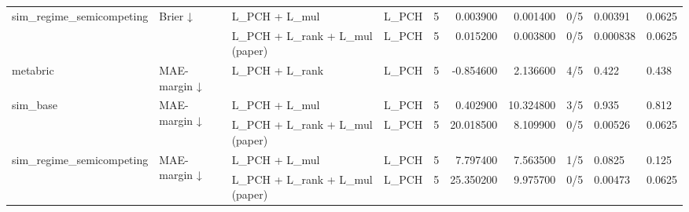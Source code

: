 \begin{tabular}{llllrrrlll}
\cline{1-10} \cline{2-10}
\multirow[t]{2}{*}{sim\_regime\_semicompeting} & \multirow[t]{2}{*}{Brier ↓} & L\_PCH + L\_mul & L\_PCH & 5 & 0.003900 & 0.001400 & 0/5 & 0.00391 & 0.0625 \\
 &  & L\_PCH + L\_rank + L\_mul (paper) & L\_PCH & 5 & 0.015200 & 0.003800 & 0/5 & 0.000838 & 0.0625 \\
\cline{1-10} \cline{2-10}
metabric & MAE-margin ↓ & L\_PCH + L\_rank & L\_PCH & 5 & -0.854600 & 2.136600 & 4/5 & 0.422 & 0.438 \\
\cline{1-10} \cline{2-10}
\multirow[t]{2}{*}{sim\_base} & \multirow[t]{2}{*}{MAE-margin ↓} & L\_PCH + L\_mul & L\_PCH & 5 & 0.402900 & 10.324800 & 3/5 & 0.935 & 0.812 \\
 &  & L\_PCH + L\_rank + L\_mul (paper) & L\_PCH & 5 & 20.018500 & 8.109900 & 0/5 & 0.00526 & 0.0625 \\
\cline{1-10} \cline{2-10}
\multirow[t]{2}{*}{sim\_regime\_semicompeting} & \multirow[t]{2}{*}{MAE-margin ↓} & L\_PCH + L\_mul & L\_PCH & 5 & 7.797400 & 7.563500 & 1/5 & 0.0825 & 0.125 \\
 &  & L\_PCH + L\_rank + L\_mul (paper) & L\_PCH & 5 & 25.350200 & 9.975700 & 0/5 & 0.00473 & 0.0625 \\
\cline{1-10} \cline{2-10}
\bottomrule
\end{tabular}
